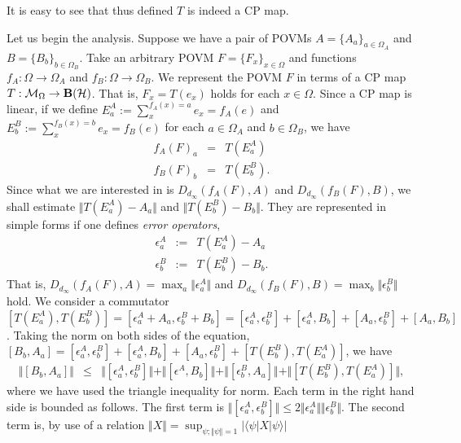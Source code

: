 \documentclass[12pt,showpacs,preprintnumbers,amsmath,amssymb]{revtex4-2}
\begin{document}
It is easy to see that thus defined $T$ is indeed a CP map. 
\par
Let us begin the analysis. 
Suppose we have a pair of POVMs $A=\{A_a\}_{a\in \Omega_A}$ 
and $B=\{B_b\}_{b \in \Omega_B}$. Take an 
arbitrary POVM $F=\{F_x\}_{x\in \Omega}$ and functions 
$f_A: \Omega \to \Omega_A$ and $f_B: \Omega \to \Omega_B$. 
We represent the POVM $F$ in terms of a CP map 
$T: {\cal M}_{\Omega} \to {\bf B}({\cal H})$. 
That is, $F_x=T(e_x)$ holds for each $x \in \Omega$.
Since a CP map is linear, if we define 
$
E^A_a:=\sum_{x}^{f_A(x)=a}e_x=f_A(e)
$ and 
$E^B_b:=\sum_{x}^{f_B(x)=b}e_x=f_B(e)$
for each $a\in \Omega_A$ and $b \in \Omega_B$, 
we have
\begin{eqnarray*}
f_A(F)_a&=& T(E^A_a) \\
f_B(F)_b&=& T(E^B_b).
\end{eqnarray*} 
Since what we are interested in is 
$D_{d_{\infty}}(f_A(F),A)$ and $D_{d_{\infty}}(f_B(F),B)$, 
we shall 
estimate $\Vert T(E^A_a)-A_a\Vert$ and $\Vert T(E^B_b)-B_b \Vert$. 
They are represented in simple forms
if one defines {\it error operators},
\begin{eqnarray*}
\epsilon^A_a&:=&T(E^A_a)-A_a \\
\epsilon^B_b&:=&T(E^B_b)-B_b. 
\end{eqnarray*}
That is, $D_{d_{\infty}}(f_A(F),A)=\max_a \Vert \epsilon^A_a\Vert$ 
and $D_{d_{\infty}}(f_B(F),B)=\max_b \Vert \epsilon^B_b\Vert$ hold. 
We consider a commutator 
$[T(E^A_a),T(E^B_b)]=[\epsilon^A_a+A_a,\epsilon^B_b+B_b]
=[\epsilon^A_a, \epsilon^B_b]
+[\epsilon^A_a, B_b]+[A_a,\epsilon^B_b]+[A_a,B_b]$.
Taking the norm on both sides of the equation, 
$[B_b,A_a]=[\epsilon^A_a,\epsilon^B_b]
+[\epsilon^A_a,B_b]+[A_a,\epsilon^B_b]+[T(E^B_b),T(E^A_a)]$, 
we have
\begin{eqnarray}
\Vert [B_b,A_a]\Vert 
&\leq & \Vert [\epsilon^A_a, \epsilon^B_b ]\Vert 
+\Vert [\epsilon^A, B_b]\Vert +\Vert [\epsilon^B_b, A_a]\Vert 
+\Vert[T(E^B_b), T(E^A_a)]\Vert, 
\label{eqnorm}
\end{eqnarray}
where we have used the triangle inequality for norm. 
Each term in the right hand side is bounded as follows. 
The first term is $\Vert[\epsilon^A_a, \epsilon^B_b]\Vert \leq 2
\Vert \epsilon^A_a\Vert \Vert \epsilon^B_b\Vert$.
The second term is, by use of a relation $\Vert X\Vert =\sup_{\psi;
\Vert \psi\Vert =1} |\langle \psi|X|\psi \rangle|$
\end{document}
